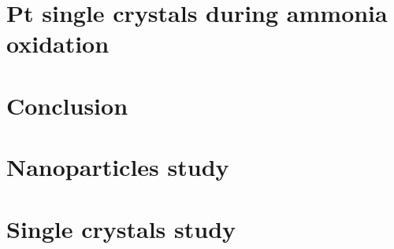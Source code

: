 \documentclass[11pt]{report}
\begin{document}
    \chapter{Pt single crystals during ammonia oxidation}
    
    
    
    

    \chapter{Conclusion}
    
    
    \printbibliography[
        heading=bibintoc,
        title={Bibliography}
    ]

    \begin{appendices}
    \chapter{Nanoparticles study}
    
    

    \chapter{Single crystals study}
    
    
    

\end{appendices}
\end{document}
